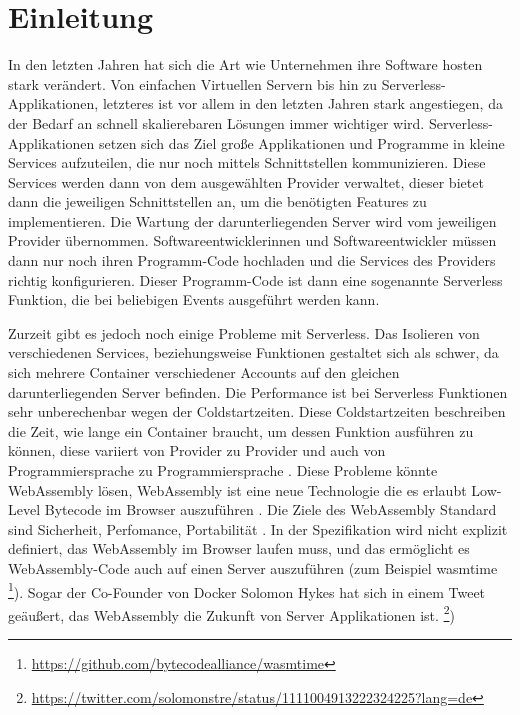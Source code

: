 \section{Einleitung}
\label{section:Introduction}

In den letzten Jahren hat sich die Art wie Unternehmen ihre Software hosten stark verändert. Von einfachen Virtuellen Servern bis hin zu Serverless-Applikationen, letzteres ist vor allem in den letzten Jahren stark angestiegen, da der Bedarf an schnell skalierebaren Lösungen immer wichtiger wird. Serverless-Applikationen setzen sich das Ziel große Applikationen und Programme in kleine Services aufzuteilen, die nur noch mittels Schnittstellen kommunizieren. Diese Services werden dann von dem ausgewählten Provider verwaltet, dieser bietet dann die jeweiligen Schnittstellen an, um die benötigten Features zu implementieren. Die Wartung der darunterliegenden Server wird vom jeweiligen Provider übernommen. Softwareentwicklerinnen und Softwareentwickler müssen dann nur noch ihren Programm-Code hochladen und die Services des Providers richtig konfigurieren. Dieser Programm-Code ist dann eine sogenannte Serverless Funktion, die bei beliebigen Events ausgeführt werden kann. \autocite[]{Wang}

Zurzeit gibt es jedoch noch einige Probleme mit Serverless. Das Isolieren von verschiedenen Services, beziehungsweise Funktionen gestaltet sich als schwer, da sich mehrere Container verschiedener Accounts auf den gleichen darunterliegenden Server befinden. Die Performance ist bei Serverless Funktionen sehr unberechenbar wegen der Coldstartzeiten. Diese Coldstartzeiten beschreiben die Zeit, wie lange ein Container braucht, um dessen Funktion ausführen zu können, diese variiert von Provider zu Provider und auch von Programmiersprache zu Programmiersprache \autocite[]{Wang}.
Diese Probleme könnte WebAssembly lösen, WebAssembly ist eine neue Technologie die es erlaubt Low-Level Bytecode im Browser auszuführen \autocite[]{Haas2017}. Die Ziele des WebAssembly Standard sind Sicherheit, Perfomance, Portabilität \autocite[]{Haas2017}. In der Spezifikation wird nicht explizit definiert, das WebAssembly im Browser laufen muss, und das ermöglicht es WebAssembly-Code auch auf einen Server auszuführen (zum Beispiel wasmtime \footnote{\url{https://github.com/bytecodealliance/wasmtime}}). Sogar der Co-Founder von Docker Solomon Hykes hat sich in einem Tweet geäußert, das WebAssembly die Zukunft von Server Applikationen ist. \footnote{\url{https://twitter.com/solomonstre/status/1111004913222324225?lang=de}})


